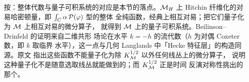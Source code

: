 \begin{yizhu}[物理图像]
按：整体代数与量子可积系统的对应是本节的落点。$\MH$ 上 Hitchin
纤维化的对易哈密顿量，即 $\int_C\alpha\,{\cal P}(\varphi)$ 型的整体
全纯函数，经典上相互对易；把它们量子化为 $\M$ 上相互对易的微分算子，
就得到 $\M$ 上的量子可积系统。Beilinson--Drinfeld 的证明来自二维共形
场论在水平 $k=-h$ 的流代数（$h$ 为对偶 Coxeter 数，即 $k$ 取临界
水平），这一点与几何 Langlands 中「Hecke 特征层」的构造同源。原文
指出这些函数不能量子化为除 $K_\M^{1/2}$ 以外任何线丛上的微分算子，
说明这种量子化不是随意选取线丛就能做到的；而 $K_\M^{1/2}$ 正是时间
反演对称性挑出的那个。
\end{yizhu}
